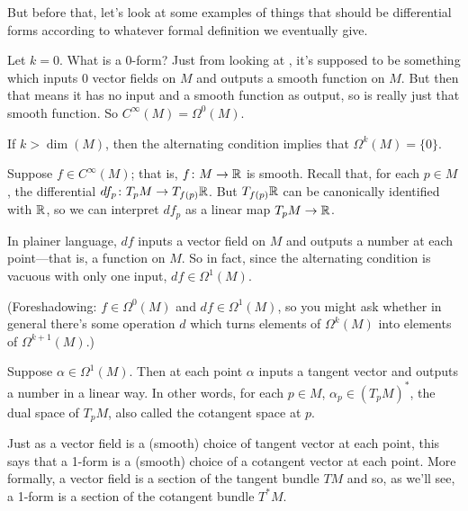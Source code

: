 But before that, let's look at some examples of things that should be differential forms according to whatever formal definition we eventually give.

\begin{example}\label{ex:0-forms and functions}
	Let $k=0$. What is a $0$-form? Just from looking at , it's supposed to be something which inputs 0 vector fields on $M$ and outputs a smooth function on $M$. But then that means it has no input and a smooth function as output, so is really just that smooth function. So $C^\infty(M) = \Omega^0(M)$.
\end{example}

\begin{example}\label{ex:k-forms with k>n}
	If $k > \dim(M)$, then the alternating condition implies that $\Omega^k(M) = \{0\}$.
\end{example}

\begin{example}\label{ex:differentials as 1-forms}
	Suppose $f \in C^\infty(M)$; that is, $f\colon\thinspace\! M \to \mathbb{R}$ is smooth. Recall that, for each $p \in M$, the differential $df_p\colon\thinspace\! T_p M \to T_{f(p)}\mathbb{R}$. But $T_{f(p)}\mathbb{R}$ can be canonically identified with $\mathbb{R}$, so we can interpret $df_p$ as a linear map $T_pM \to \mathbb{R}$. 
	
	In plainer language, $df$ inputs a vector field on $M$ and outputs a number at each point---that is, a function on $M$. So in fact, since the alternating condition is vacuous with only one input, $df \in \Omega^1(M)$.
	
	(Foreshadowing: $f \in \Omega^0(M)$ and $df \in \Omega^1(M)$, so you might ask whether in general there's some operation $d$ which turns elements of $\Omega^k(M)$ into elements of $\Omega^{k+1}(M)$.)
\end{example}

\begin{example}\label{ex:1-forms as covectors}
	Suppose $\alpha\in \Omega^1(M)$. Then at each point $\alpha$ inputs a tangent vector and outputs a number in a linear way. In other words, for each $p \in M$, $\alpha_p \in \left(T_pM\right)^\ast$, the dual space of $T_pM$, also called the cotangent space at $p$.
	
	Just as a vector field is a (smooth) choice of tangent vector at each point, this says that a 1-form is a (smooth) choice of a cotangent vector at each point. More formally, a vector field is a section of the tangent bundle $TM$ and so, as we'll see, a 1-form is a section of the cotangent bundle $T^\ast M$.
\end{example}


